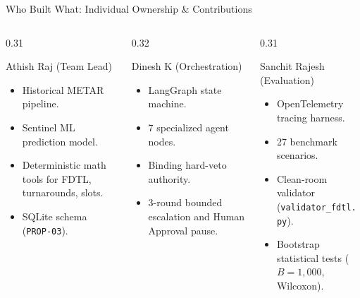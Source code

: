 \documentclass[aspectratio=169,10pt]{beamer}
\begin{document}
\begin{frame}{Who Built What: Individual Ownership \& Contributions}
  \begin{columns}[t]
    \begin{column}{0.31\textwidth}
      \begin{block}{Athish Raj (Team Lead)}
        \scriptsize
        \begin{itemize}
          \item Historical METAR pipeline.
          \item Sentinel ML prediction model.
          \item Deterministic math tools for FDTL, turnarounds, slots.
          \item SQLite schema (\texttt{PROP-03}).
        \end{itemize}
      \end{block}
    \end{column}
    \begin{column}{0.32\textwidth}
      \begin{block}{Dinesh K (Orchestration)}
        \scriptsize
        \begin{itemize}
          \item LangGraph state machine.
          \item 7 specialized agent nodes.
          \item Binding hard-veto authority.
          \item 3-round bounded escalation and Human Approval pause.
        \end{itemize}
      \end{block}
    \end{column}
    \begin{column}{0.31\textwidth}
      \begin{block}{Sanchit Rajesh (Evaluation)}
        \scriptsize
        \begin{itemize}
          \item OpenTelemetry tracing harness.
          \item 27 benchmark scenarios.
          \item Clean-room validator (\texttt{validator\_fdtl.py}).
          \item Bootstrap statistical tests ($B=1,000$, Wilcoxon).
        \end{itemize}
      \end{block}
    \end{column}
  \end{columns}
\end{frame}
\end{document}
